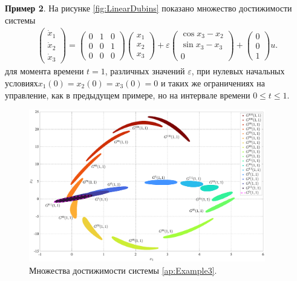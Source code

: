 \documentclass[../main.tex]{subfiles}
\begin{document}
  	 \textbf{Пример 2}. На рисунке \ref{fig:LinearDubins} показано множество достижимости системы 
  \begin{gather}\label{ap:Linear+Dubins}
  	\begin{pmatrix} 
  		\dot{x}_1 \\
  		\dot{x}_2 \\ 
  		\dot{x}_3 \end{pmatrix} = 
  	\begin{pmatrix}
  		0 & 1 & 0 \\
  		0 & 0 & 1 \\
  		0 & 0 & 0
  	\end{pmatrix}
  	\begin{pmatrix} 
  		x_1 \\
  		x_2 \\ 
  		x_3 \end{pmatrix} + 
  	\varepsilon
  	\begin{pmatrix}
  		\cos x_3 - x_2\\
  		\sin x_3 - x_3 \\
  		0
  	\end{pmatrix} + 
  	\begin{pmatrix}
  		0 \\ 0 \\ 1
  	\end{pmatrix} u.
  \end{gather}
  	для момента времени $t = 1$, различных значений $\varepsilon$, при нулевых начальных условиях$x_1(0) = x_2(0) = x_3(0) = 0 $ и таких же ограничениях на управление, как в предыдущем примере, но на интервале времени $0 \leqslant t \leqslant 1$.
  	
  	\begin{figure}[t]
  		\centering
  			\includegraphics[width=0.92\textwidth]{images/Osipov_QuaziLinearExp.eps}
  		\caption{Множества достижимости системы \eqref{ap:Example3}.}
  		\label{ap:fig:QuaziLinearExp}
  	\end{figure}
 
\end{document}

